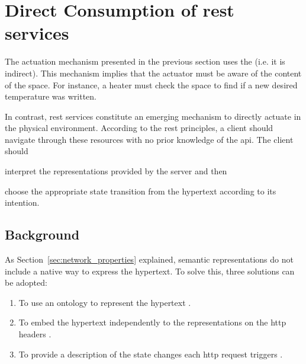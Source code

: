 \section{Direct Consumption of \acs{rest} services}
\label{sec:direct_actuation}


The actuation mechanism presented in the previous section uses the \Space{} (i.e. it is indirect).
This mechanism implies that the actuator must be aware of the content of the space.
For instance, a heater must check the space to find if a new desired temperature was written.


In contrast, \ac{rest} services constitute an emerging mechanism to directly actuate in the physical environment.
According to the \ac{rest} principles, a client should navigate through these resources with no prior knowledge of the \ac{api}.
The client should 
\begin{enumerate*}[label=\itshape(\arabic*\upshape)]
  \item interpret the representations provided by the server and then
  \item choose the appropriate state transition from the hypertext according to its intention. %
\end{enumerate*}


\subsection{Background}


As Section~\ref{sec:network_properties} explained, semantic representations do not include a native way to express the hypertext. %
To solve this, three solutions can be adopted:
\begin{enumerate}
  \item To use an ontology to represent the hypertext \citep{kjernsmo_necessity_2012}.
  \item To embed the hypertext independently to the representations on the \ac{http} headers \citep{mark_web_2010}.
  \item To provide a description of the state changes each \ac{http} request triggers \citep{verborgh_functional_2012,verborgh_ijcs_2014}.
\end{enumerate}


